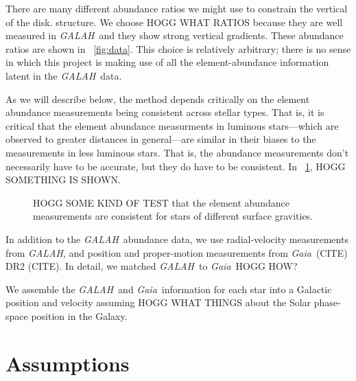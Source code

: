 \documentclass[modern]{aastex62}
\newcommand{\acronym}[1]{{\small{#1}}}
\newcommand{\project}[1]{\textsl{#1}}
\newcommand{\galah}{\project{\acronym{GALAH}}}
\newcommand{\gaia}{\project{Gaia}}
\begin{document}
There are many different abundance ratios we might use to constrain the vertical of the disk.
structure.
We choose HOGG WHAT RATIOS because they are well measured in \galah\ and they show strong
vertical gradients.
These abundance ratios are shown in \figurename~\ref{fig:data}.
This choice is relatively arbitrary; there is no sense in which this project is making use
of all the element-abundance information latent in the \galah\ data.

As we will describe below, the method depends critically on the element abundance
measurements being consistent across stellar types.
That is, it is critical that the element abundance measurments in luminous
stars---which are observed to greater distances in general---are similar in their
biases to the measurements in less luminous stars.
That is, the abundance measurements don't necessarily have to be accurate, but
they do have to be consistent.
In \figurename~\ref{fig:testing}, HOGG SOMETHING IS SHOWN.
\begin{figure}
\caption{HOGG SOME KIND OF TEST that the element abundance measurements
are consistent for stars of different surface gravities.\label{fig:testing}}
\end{figure}

In addition to the \galah\ abundance data, we use radial-velocity measurements from \galah,
and position and proper-motion measurements from \gaia\ (CITE) \acronym{DR2} (CITE).
In detail, we matched \galah\ to \gaia\ HOGG HOW?

We assemble the \galah\ and \gaia\ information for each star into a Galactic position and
velocity assuming HOGG WHAT THINGS about the Solar phase-space position in the Galaxy.

\section{Assumptions}
\end{document}
